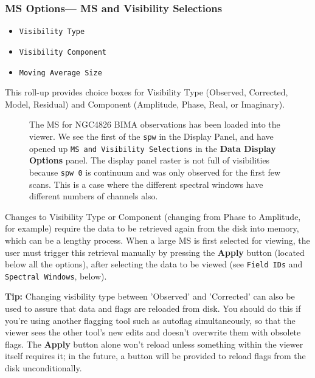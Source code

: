 \subsubsection{MS Options--- MS and Visibility Selections}
\label{section:display.ms.adjust.select}

\begin{itemize}

\item {\tt Visibility Type}

\item {\tt Visibility Component}

\item {\tt Moving Average Size}

\end{itemize}

This roll-up provides choice boxes for Visibility Type
(Observed, Corrected, Model, Residual) and Component (Amplitude,
Phase, Real, or Imaginary).  

\begin{figure}[h!]
\begin{center}
\caption{\label{fig:viewer_axes_1} The MS for NGC4826 BIMA
observations has been loaded into the viewer.  We see the
first of the {\tt spw} in the Display Panel, and have opened
up {\tt MS and Visibility Selections} in the
{\bf Data Display Options} panel.  The display panel raster is
not full of visibilities because {\tt spw 0} is continuum and
was only observed for the first few scans.  This is a case where
the different spectral windows have different numbers of channels
also.}
\hrulefill
\end{center}
\end{figure}

Changes to Visibility Type or Component (changing from Phase to
Amplitude, for example) require the data to be retrieved again
from the disk into memory, which can be a lengthy process.  When a
large MS is first selected for viewing, the user must
trigger this retrieval manually by pressing the {\bf Apply} button
(located below all the options), after selecting the data to be
viewed (see {\tt Field IDs} and {\tt Spectral Windows}, below).

{\bf Tip:} Changing visibility type between 'Observed' and 'Corrected' can
also be used to assure that data and flags are reloaded from disk.  You
should do this if you're using another flagging tool such as autoflag
simultaneously, so that the viewer sees the other tool's new edits
and doesn't overwrite them with obsolete flags.  The {\bf Apply} button 
alone won't reload unless something within the viewer itself requires
it; in the future, a button will be provided to reload flags from the disk
unconditionally.  

